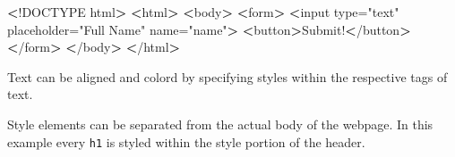 \documentclass[]{book}
\newenvironment{Shaded}{\begin{snugshade}}{\end{snugshade}}
\newcommand{\StringTok}[1]{\textcolor[rgb]{0.31,0.60,0.02}{#1}}
\newcommand{\OperatorTok}[1]{\textcolor[rgb]{0.81,0.36,0.00}{\textbf{#1}}}
\newcommand{\ExtensionTok}[1]{#1}
\newcommand{\NormalTok}[1]{#1}
\begin{document}
\begin{Shaded}
\begin{Highlighting}[]
\OperatorTok{<}\NormalTok{!}\ExtensionTok{DOCTYPE}\NormalTok{ html}\OperatorTok{>}         
\OperatorTok{<}\ExtensionTok{html}\OperatorTok{>}                  
    \OperatorTok{<}\ExtensionTok{body}\OperatorTok{>}              
        \OperatorTok{<}\ExtensionTok{form}\OperatorTok{>}                                                     
            \OperatorTok{<}\ExtensionTok{input}\NormalTok{ type=}\StringTok{"text"}\NormalTok{ placeholder=}\StringTok{"Full Name"}\NormalTok{ name=}\StringTok{"name"}\OperatorTok{>}
            \OperatorTok{<}\ExtensionTok{button}\OperatorTok{>}\NormalTok{Submit!}\OperatorTok{<}\NormalTok{/button}\OperatorTok{>}                               
        \OperatorTok{<}\NormalTok{/}\ExtensionTok{form}\OperatorTok{>}                                                    
    \OperatorTok{<}\NormalTok{/}\ExtensionTok{body}\OperatorTok{>}             
\OperatorTok{<}\NormalTok{/}\ExtensionTok{html}\OperatorTok{>}                 
\end{Highlighting}
\end{Shaded}

Text can be aligned and colord by specifying styles within the
respective tags of text.

\begin{Shaded}
\end{Shaded}

Style elements can be separated from the actual body of the webpage. In
this example every \texttt{h1} is styled within the style portion of the
header.
\end{document}
